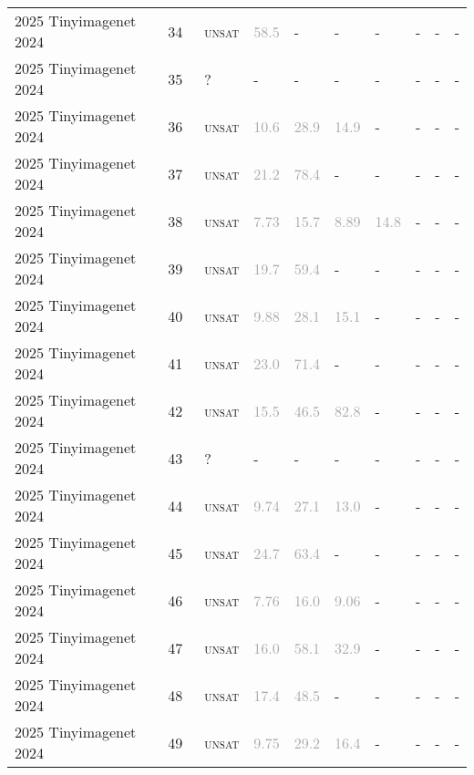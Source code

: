 \begin{center}
{\begin{longtable}{@{}llllllllll@{}}
2025 Tinyimagenet 2024 & 34 & ~\textsc{unsat} & \textcolor{darkgray}{58.5} & - & - & - & - & - & - \\
2025 Tinyimagenet 2024 & 35 & ~? & - & - & - & - & - & - & - \\
2025 Tinyimagenet 2024 & 36 & ~\textsc{unsat} & \textcolor{darkgray}{10.6} & \textcolor{darkgray}{28.9} & \textcolor{darkgray}{14.9} & - & - & - & - \\
2025 Tinyimagenet 2024 & 37 & ~\textsc{unsat} & \textcolor{darkgray}{21.2} & \textcolor{darkgray}{78.4} & - & - & - & - & - \\
2025 Tinyimagenet 2024 & 38 & ~\textsc{unsat} & \textcolor{darkgray}{7.73} & \textcolor{darkgray}{15.7} & \textcolor{darkgray}{8.89} & \textcolor{darkgray}{14.8} & - & - & - \\
2025 Tinyimagenet 2024 & 39 & ~\textsc{unsat} & \textcolor{darkgray}{19.7} & \textcolor{darkgray}{59.4} & - & - & - & - & - \\
2025 Tinyimagenet 2024 & 40 & ~\textsc{unsat} & \textcolor{darkgray}{9.88} & \textcolor{darkgray}{28.1} & \textcolor{darkgray}{15.1} & - & - & - & - \\
2025 Tinyimagenet 2024 & 41 & ~\textsc{unsat} & \textcolor{darkgray}{23.0} & \textcolor{darkgray}{71.4} & - & - & - & - & - \\
2025 Tinyimagenet 2024 & 42 & ~\textsc{unsat} & \textcolor{darkgray}{15.5} & \textcolor{darkgray}{46.5} & \textcolor{darkgray}{82.8} & - & - & - & - \\
2025 Tinyimagenet 2024 & 43 & ~? & - & - & - & - & - & - & - \\
2025 Tinyimagenet 2024 & 44 & ~\textsc{unsat} & \textcolor{darkgray}{9.74} & \textcolor{darkgray}{27.1} & \textcolor{darkgray}{13.0} & - & - & - & - \\
2025 Tinyimagenet 2024 & 45 & ~\textsc{unsat} & \textcolor{darkgray}{24.7} & \textcolor{darkgray}{63.4} & - & - & - & - & - \\
2025 Tinyimagenet 2024 & 46 & ~\textsc{unsat} & \textcolor{darkgray}{7.76} & \textcolor{darkgray}{16.0} & \textcolor{darkgray}{9.06} & - & - & - & - \\
2025 Tinyimagenet 2024 & 47 & ~\textsc{unsat} & \textcolor{darkgray}{16.0} & \textcolor{darkgray}{58.1} & \textcolor{darkgray}{32.9} & - & - & - & - \\
2025 Tinyimagenet 2024 & 48 & ~\textsc{unsat} & \textcolor{darkgray}{17.4} & \textcolor{darkgray}{48.5} & - & - & - & - & - \\
2025 Tinyimagenet 2024 & 49 & ~\textsc{unsat} & \textcolor{darkgray}{9.75} & \textcolor{darkgray}{29.2} & \textcolor{darkgray}{16.4} & - & - & - & - \\

\end{longtable}}
\end{center}
